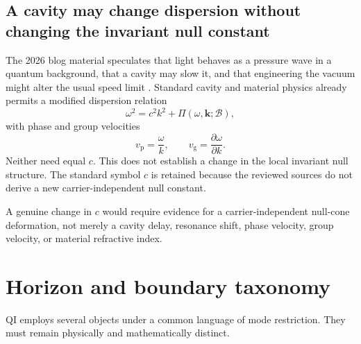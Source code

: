 \documentclass[11pt]{article}
\newcommand{\Bdy}{\mathcal{B}}
\begin{document}
\subsection{A cavity may change dispersion without changing the invariant null constant}

The 2026 blog material speculates that light behaves as a pressure wave in a quantum background, that a cavity may slow it, and that engineering the vacuum might alter the usual speed limit \cite{McCullochBlog2026}. Standard cavity and material physics already permits a modified dispersion relation
\begin{equation}
    \omega^{2}=c^{2}k^{2}+\Pi(\omega,\mathbf k;\Bdy),
    \label{eq:dispersion}
\end{equation}
with phase and group velocities
\begin{equation}
    v_{\mathrm p}=\frac{\omega}{k},
    \qquad
    v_{\mathrm g}=\frac{\partial\omega}{\partial k}.
\end{equation}
Neither need equal \(c\). This does not establish a change in the local invariant null structure. The standard symbol \(c\) is retained because the reviewed sources do not derive a new carrier-independent null constant.

A genuine change in \(c\) would require evidence for a carrier-independent null-cone deformation, not merely a cavity delay, resonance shift, phase velocity, group velocity, or material refractive index.

\section{Horizon and boundary taxonomy}
\label{sec:taxonomy}

QI employs several objects under a common language of mode restriction. They must remain physically and mathematically distinct.
\end{document}
